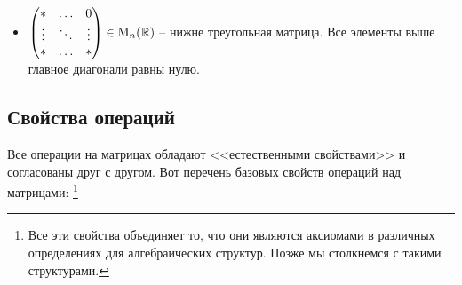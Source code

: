 \begin{itemize}
\item
 $
\begin{pmatrix}
{*}&{\ldots}&{0}\\
{\vdots}&{\ddots}&{\vdots}\\
{*}&{\ldots}&{*}\\
\end{pmatrix}\in \operatorname{M}_{n}(\mathbb R)$ -- нижне треугольная матрица.
Все элементы выше главное диагонали равны нулю.
\end{itemize}

\subsection{Свойства операций}

Все операции на матрицах обладают <<естественными свойствами>> и согласованы друг с другом.
Вот перечень базовых свойств операций над матрицами:%
\footnote{Все эти свойства объединяет то, что они являются аксиомами в различных определениях для алгебраических структур.
Позже мы столкнемся с такими структурами.}

